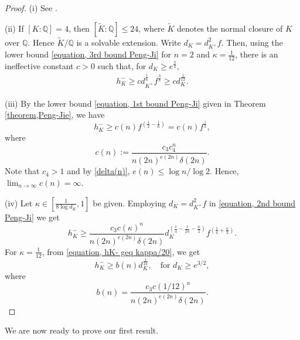 \documentclass[12pt]{amsart}
\theoremstyle{definition}
\numberwithin{equation}{section}
\begin{document}
\begin{proof}
(i) See \cite[Proof of Theorem 1] {Louboutin}.

(ii) If $[K:\mathbb{Q}]=4$, then $[\tilde{K}:\mathbb{Q}] \leq 24$, where $\tilde{K}$ denotes the normal closure of $K$ over $\mathbb{Q}$. Hence $\tilde{K}/\mathbb{Q}$ is a solvable extension. Write $d_K=d_{K^+}^2f$. Then, using the lower bound \eqref{equation, 3rd bound Peng-Ji} for $n=2$ and $\kappa=\frac{1}{12}$, there is an ineffective constant $c>0$ such that, for $d_K \geq e^{\frac{3}{2}}$,
\begin{align*}
h_K^- \geq 
c d_{K^+}^{\frac{1}{6}} f^{\frac{3}{8}} \geq c d_K^{\frac{1}{12}}.
\end{align*}

(iii) By the lower bound \eqref{equation, 1st bound Peng-Ji} given in Theorem \ref{theorem,Peng-Jie}, we have
\begin{equation*}
	h_K^- 
	\geq c(n) f^{\left(\frac{1}{2}-\frac{1}{6}\right)}=c(n)f^{\frac{1}{3}},  
\end{equation*}
where
\begin{equation*}
c(n):=\frac{c_3 c_4^n}{n (2n)^{e(2n)} \delta (2n)}. 
\end{equation*}
 Note that $c_4>1$ and by \eqref{delta(n)}, $e(n)\leq \log{n}/\log{2}$. Hence, $\lim_{n\rightarrow \infty} c(n)=\infty$.

(iv) Let $\kappa \in \left[\frac{1}{8 \log {d_K}}, 1\right]$ be given.  
Employing $d_K=d_{K^+}^2 f$ in \eqref{equation, 2nd bound Peng-Ji} we get
\begin{equation} \label{equation, hK- geq kappa/20}
	h_K^- \geq  \frac{c_3 c(\kappa)^n}{n(2n)^{e(2n)} \delta(2n)} d_K^{(\frac{1}{4}-\frac{1}{2n}-\frac{\kappa}{2})} f^{(\frac{1}{4}+\frac{\kappa}{2})}.
\end{equation}
For $\kappa=\frac{1}{12}$, from \eqref{equation, hK- geq kappa/20}, we get
\begin{equation*}
	h_K^- \geq b(n) d_K^{\frac{1}{24}}, \quad \text{for} \, \, d_K \geq e^{3/2},
\end{equation*}
where 
\begin{equation} \label{equation, b(n)}
b(n)=\frac{c_3 c(1/12)^n}{n(2n)^{e(2n)} \delta(2n)}.
\end{equation}


\end{proof}

We are now ready to prove our first result.
\end{document}
